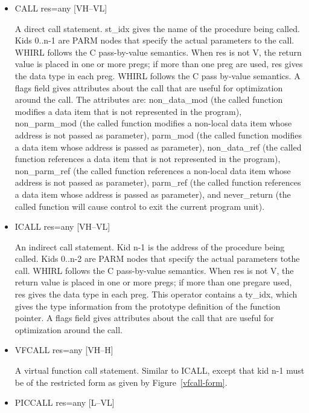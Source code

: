 \begin{itemize}

%
\item  CALL res=any \hfill [VH--VL]

A direct call statement. st\_idx gives the name of the procedure
being called. Kids 0..n-1 are
%
PARM nodes that specify the actual parameters to the call. WHIRL
follows the C pass-by-value semantics. When res is not V, 
the return value is placed in one or more pregs; if more than
one preg are used, res gives the data type in each preg. WHIRL
follows the C pass by-value semantics. A flags field gives attributes
about the call that are useful for optimization around the call.
The attributes are: non\_data\_mod (the called function modifies a
data item that is not represented in the program), non\_parm\_mod (the
called function modifies a non-local data item whose address is
not passed as parameter), parm\_mod (the called
function modifies a data item whose address is passed as
parameter), non\_data\_ref (the called function references a data item
that is not represented in the program), non\_parm\_ref (the called
function references a non-local data item whose address is not passed
as parameter), parm\_ref (the called function references a data item
whose address is passed as parameter), and never\_return (the called
function will cause control to exit the current program unit).

%
\item  ICALL res=any \hfill [VH--VL]

An indirect call statement. Kid n-1 is the address of the procedure
being called. Kids 0..n-2 are
%
PARM nodes that specify the actual parameters tothe call. WHIRL
follows the C pass-by-value semantics. When res is not
V, the return value is placed in one or more pregs; if more than
one pregare used, res gives the data type in each preg. This operator
contains a ty\_idx, which gives the type information from the
prototype definition of the function pointer. A flags field gives
attributes about the call that are useful for optimization around
the call. 

%
\item  VFCALL res=any \hfill [VH--H]

A virtual function call statement. Similar to ICALL, except that
kid n-1 must be of the restricted form as given by
Figure~\ref{vfcall-form}.

\item
{}%
PICCALL res=any [L--VL]


\end{itemize}
